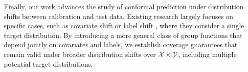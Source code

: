 Finally, our work advances the study of conformal prediction under distribution shifts between calibration and test data. Existing research largely focuses on specific cases, such as covariate shift \citep{TBCR19, QDT23, YKT24, PNI24} or label shift \citep{PR21}, where they consider a single target distribution. By introducing a more general class of group functions that depend jointly on covariates and labels, we establish coverage guarantees that remain valid under broader distribution shifts over $\cal X \times \cal Y$, including multiple potential target distributions.

